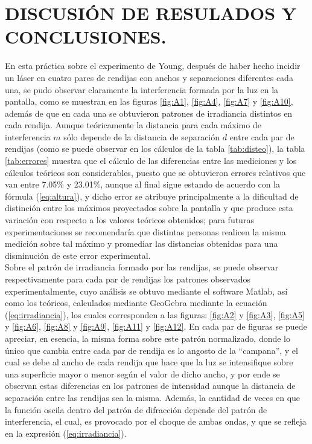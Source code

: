 \documentclass[12pt,a4paper]{article}
\begin{document}
	\newpage

\section{DISCUSIÓN DE RESULADOS Y CONCLUSIONES.} %
En esta práctica sobre el experimento de Young, después de haber hecho incidir un láser en cuatro pares de rendijas con anchos y separaciones diferentes cada una, se pudo observar claramente la interferencia formada por la luz en la pantalla, como se muestran en las figuras \ref{fig:A1}, \ref{fig:A4}, \ref{fig:A7} y \ref{fig:A10}, además de que en cada una se obtuvieron patrones de irradiancia distintos en cada rendija. Aunque teóricamente la distancia para cada máximo de interferencia $m$ sólo depende de la distancia de separación $d$ entre cada par de rendijas (como se puede observar en los cálculos de la tabla \ref{tab:disteo}), la tabla \ref{tab:errores} muestra que el cálculo de las diferencias entre las mediciones y los cálculos teóricos son considerables, puesto que se obtuvieron errores relativos que van entre 7.05\% y 23.01\%, aunque al final sigue estando de acuerdo con la fórmula (\ref{eq:altura}), y dicho error se atribuye principalmente a la dificultad de distinción entre los máximos proyectados sobre la pantalla y que produce esta variación con respecto a los valores teóricos obtenidos; para futuras experimentaciones se recomendaría que distintas personas realicen la misma medición sobre tal máximo y promediar las distancias obtenidas para una disminución de este error experimental. \\[2mm]
Sobre el patrón de irradiancia formado por las rendijas, se puede observar respectivamente para cada par de rendijas los patrones observados experimentalmente, cuyo análisis se obtuvo mediante el software Matlab, así como los teóricos, calculados mediante GeoGebra mediante la ecuación (\ref{eq:irradiancia}), los cuales corresponden a las figuras: \ref{fig:A2} y \ref{fig:A3}, \ref{fig:A5} y \ref{fig:A6}, \ref{fig:A8} y \ref{fig:A9}, \ref{fig:A11} y \ref{fig:A12}. En cada par de figuras se puede apreciar, en esencia, la misma forma sobre este patrón normalizado, donde lo único que cambia entre cada par de rendija es lo angosto de la “campana”, y el cual se debe al ancho de cada rendija que hace que la luz se intensifique sobre una superficie mayor o menor según el valor de dicho ancho, y por ende se observan estas diferencias en los patrones de intensidad aunque la distancia de separación entre las rendijas sea la misma. Además, la cantidad de veces en que la función oscila dentro del patrón de difracción depende del patrón de interferencia, el cual, es provocado por el choque de ambas ondas, y que se refleja en la expresión (\ref{eq:irradiancia}). \\[2mm]
\end{document}
